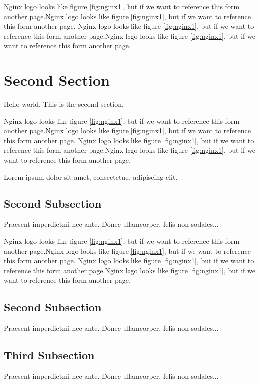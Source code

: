 \documentclass[10pt, a4paper]{article} %
\begin{document}
Nginx logo looks like figure \ref{fig:nginx1}, but if we want to reference this form another page.Nginx logo looks like figure \ref{fig:nginx1}, but if we want to reference this form another page.
Nginx logo looks like figure \ref{fig:nginx1}, but if we want to reference this form another page.Nginx logo looks like figure \ref{fig:nginx1}, but if we want to reference this form another page.

\section{Second Section}

Hello world. This is the second section.

Nginx logo looks like figure \ref{fig:nginx1}, but if we want to reference this form another page.Nginx logo looks like figure \ref{fig:nginx1}, but if we want to reference this form another page.
Nginx logo looks like figure \ref{fig:nginx1}, but if we want to reference this form another page.Nginx logo looks like figure \ref{fig:nginx1}, but if we want to reference this form another page.

Lorem ipsum dolor sit amet, consectetuer adipiscing elit.

\subsection{Second Subsection}

Praesent imperdietmi nec ante. Donec ullamcorper, felis non sodales...

Nginx logo looks like figure \ref{fig:nginx1}, but if we want to reference this form another page.Nginx logo looks like figure \ref{fig:nginx1}, but if we want to reference this form another page.
Nginx logo looks like figure \ref{fig:nginx1}, but if we want to reference this form another page.Nginx logo looks like figure \ref{fig:nginx1}, but if we want to reference this form another page.

\subsection{Second Subsection}
Praesent imperdietmi nec ante. Donec ullamcorper, felis non sodales...

\subsection{Third Subsection}
Praesent imperdietmi nec ante. Donec ullamcorper, felis non sodales...
\end{document}
